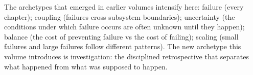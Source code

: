 The archetypes that emerged in earlier volumes intensify here: failure (every chapter); coupling (failures cross subsystem boundaries); uncertainty (the conditions under which failure occurs are often unknown until they happen); balance (the cost of preventing failure vs the cost of failing); scaling (small failures and large failures follow different patterns). The new archetype this volume introduces is investigation: the disciplined retrospective that separates what happened from what was supposed to happen.


\vspace{1cm}
